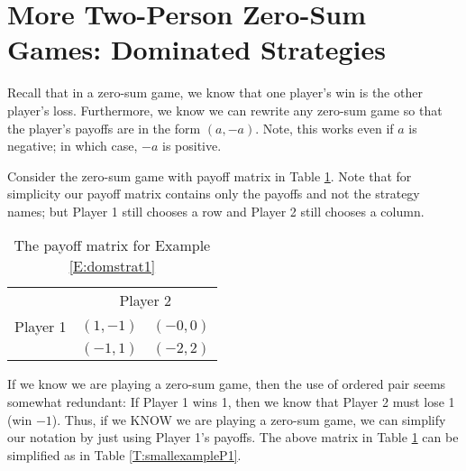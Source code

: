 
\section{More Two-Person Zero-Sum Games: Dominated Strategies}


\vspace{.2in}


Recall that in a zero-sum game, we know that one player's win is the other player's loss. Furthermore, we know we can rewrite any zero-sum game so that the player's payoffs are in the form $(a, -a)$. Note, this works even if $a$ is negative; in which case, $-a$ is positive.

\begin{example}\label{E:domstrat1} Consider the zero-sum game with payoff matrix in Table \ref{T:smallexample}. Note that for simplicity our payoff matrix contains only the payoffs and not the strategy names; but Player 1 still chooses a row and Player 2 still chooses a column.



\begin{table}[h]
\centering

\begin{tabular}{ccc}
                      & \multicolumn{2}{c}{Player 2}                                                  \\ \cline{2-3} 
\multicolumn{1}{l|}{Player 1}  & \multicolumn{1}{c|}{$(1, -1)$} & \multicolumn{1}{c|}{$(-0, 0)$} \\ \cline{2-3} 
\multicolumn{1}{l|}{}  & \multicolumn{1}{c|}{$(-1, 1)$} & \multicolumn{1}{c|}{$(-2, 2)$} \\ \cline{2-3} 
\end{tabular}
\caption{The payoff matrix for Example \ref{E:domstrat1}}
\label{T:smallexample}
\end{table}


If we know we are playing a zero-sum game, then the use of ordered pair seems somewhat redundant: If Player 1 wins 1, then we know that Player 2 must lose 1 (win $-1$). Thus, if we KNOW we are playing a zero-sum game, we can simplify our notation by just using Player 1's payoffs. The above matrix in Table \ref{T:smallexample} can be simplified as in Table \ref{T:smallexampleP1}.


\end{example}
